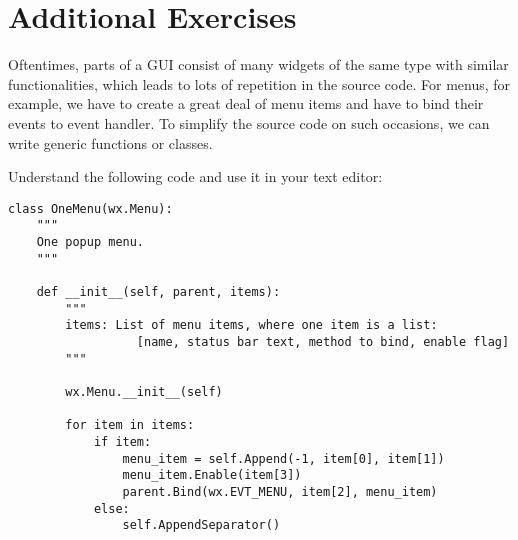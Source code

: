 \newpage 

\section*{Additional Exercises}

\begin{aufgabe}[Refactoring]

Oftentimes, parts of a GUI consist of many widgets of the same type with similar functionalities, which leads to lots of repetition in the source code. For menus, for example, we have to create a great deal of menu items and have to bind their events to event handler. To simplify the source code on such occasions, we can write generic functions or classes. 

Understand the following code and use it in your text editor:
\begin{lstlisting}
class OneMenu(wx.Menu):
    """
    One popup menu.
    """

    def __init__(self, parent, items):
        """
        items: List of menu items, where one item is a list:
                  [name, status bar text, method to bind, enable flag]
        """ 

        wx.Menu.__init__(self)
 
        for item in items:
            if item:
                menu_item = self.Append(-1, item[0], item[1])
                menu_item.Enable(item[3])
                parent.Bind(wx.EVT_MENU, item[2], menu_item)
            else:
                self.AppendSeparator()
\end{lstlisting}

\end{aufgabe}
